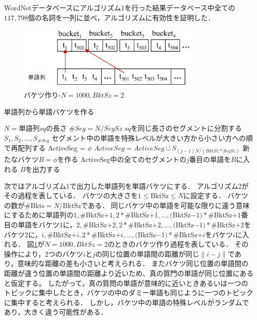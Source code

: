 \documentclass{jsarticle}
\theoremstyle{definition}
\begin{document}
WordNetデータベースにアルゴリズム1を行った結果データベース中全ての$117,798$個の名詞を一列に並べ，アルゴリズムに有効性を証明した．

\begin{figure}[!hbp]
    \centering
    \includegraphics[width=0.8\textwidth,natwidth=5677,natheight=1982]{rk11.png}
	\caption{バケツ作り-$N=1000,BktSz=2$}\label{fig:pp1}
\end{figure}

\begin{algorithm}
\caption{単語列から単語バケツを作る}
\begin{algorithmic}[1]
	\State $N=$単語列$sq$の長さ
	\State $\#Seg=N/SegSz$
	\State $sq$を同じ長さのセグメントに分割する$S_1,S_2, \dots , S_{\#Seg}$
	\State セグメント中の単語を特殊レベルが大きい方から小さい方への順で再配列する
	\State ActiveSeg = $\phi$
		\State $ActiveSeg = ActiveSeg \cup S_{(j-1)N/(BktSz * SegSz)}$
		\EndFor
		\State 新たなバケツ$B=\phi$を作る
		\State ActiveSeg中の全てのセグメントの$j$番目の単語を$B$に入れる
		\State $B$を出力する
		\EndFor
	\EndFor
\EndFunction
\end{algorithmic}
\end{algorithm}

次ではアルゴリズム1で出力した単語列を単語バケツにする．
アルゴリズム2がその過程を表している．
バケツの大きさを$1 \leq$BktSz$\leq N$に設定する．
バケツの数が\#Bkts$=N/$BktSzである．
同じバケツ中の単語を可能な限りに違う意味にするために単語列の$1,\#$BktSz$+1,2*\#$BktSz$+1, \dots,($BktSz$-1)*\#$BktSz$+1$番目の単語をバケツ1に，$2,\#$BktSz$+2,2*\#$BktSz$+2, \dots,($BktSz$-1)*\#$BktSz$+2$をバケツ2に，$i,\#$BktSz$+i,2*\#$BktSz$+i, \dots,($BktSz$-1)*\#$BktSz$+i$をバケツ$i$に入れる．
図\ref{fig:pp1}が$N=1000,BktSz=2$のときのバケツ作り過程を表している．
その操作により，2つのバケツ$i$と$j$の同じ位置の単語間の距離が同じ$\|i-j\|$であり，意味的な距離の差も小さいと考えられる．
またバケツ同じ位置の単語間の距離が違う位置の単語間の距離より近いため、真の質門の単語が同じ位置にあると仮定する。
したがって，真の質問の単語が意味的に近いときあるいは一つのトピックに集中したとき，バケツの中のダミー単語も同じように一つのトピックに集中すると考えられる．
しかし，バケツ中の単語の特殊レベルがランダムであり，大きく違う可能性がある．
\end{document}
